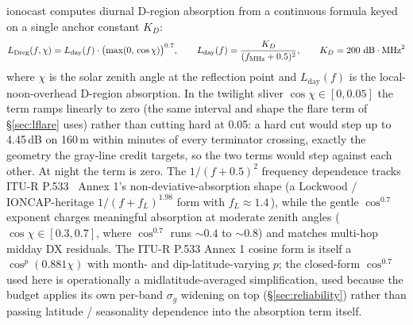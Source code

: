 \documentclass[11pt,a4paper]{article}
\newcommand{\si}[1]{\text{#1}}
\newcommand{\dB}{\text{dB}}
\newcommand{\MHz}{\text{MHz}}
\begin{document}
ionocast computes diurnal D-region absorption from a continuous
formula keyed on a single anchor constant $K_D$:
\begin{equation}\label{eq:labsd}
  L_{\text{Dreg}}(f, \chi) = L_{\text{day}}(f) \cdot
    \bigl(\max(0,\,\cos\chi)\bigr)^{0.7},
  \qquad
  L_{\text{day}}(f) = \frac{K_D}{(f_{\text{MHz}} + 0.5)^{2}},
  \qquad K_D = 200~\si{\dB}\cdot\si{\MHz}^{2}
\end{equation}
where $\chi$ is the solar zenith angle at the reflection point and
$L_{\text{day}}(f)$ is the local-noon-overhead D-region absorption.
In the twilight sliver $\cos\chi \in [0, 0.05]$ the term ramps
linearly to zero (the same interval and shape the flare term of
\S\ref{sec:lflare} uses) rather than cutting hard at 0.05: a
hard cut would step up to 4.45\,dB on 160\,m within minutes of
every terminator crossing, exactly the geometry the gray-line
credit targets, so the two terms would step against each other.
At night the term is zero.
The $1/(f+0.5)^{2}$
frequency dependence tracks ITU-R P.533~\cite{itup533} Annex 1's
non-deviative-absorption shape (a Lockwood / IONCAP-heritage
$1/(f+f_L)^{1.98}$ form with $f_L \approx 1.4$\,\si{\MHz}),
while the gentle $\cos^{0.7}$ exponent
charges meaningful absorption at moderate zenith angles
($\cos\chi \in
[0.3, 0.7]$, where $\cos^{0.7}$ runs $\sim\!0.4$ to $\sim\!0.8$)
and matches
multi-hop midday DX residuals.
The ITU-R P.533 Annex 1 cosine form is itself a
$\cos^{p}(0.881\chi)$ with month- and dip-latitude-varying $p$;
the closed-form $\cos^{0.7}$ used here is operationally a
midlatitude-averaged simplification, used because the budget
applies its own per-band $\sigma_g$ widening on top
(\S\ref{sec:reliability}) rather than passing latitude /
seasonality dependence into the absorption term itself.
\end{document}
